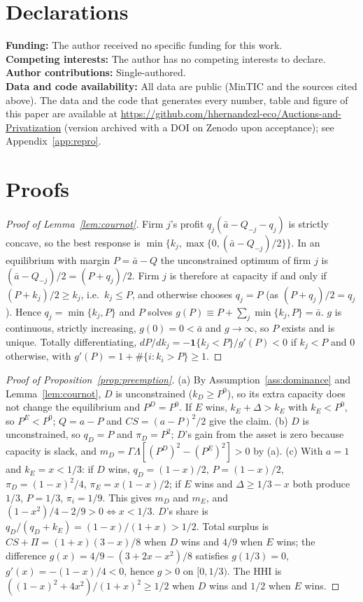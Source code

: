 \documentclass[12pt,a4paper]{article}
\newcommand{\repourl}{\url{https://github.com/hhernandezl-eco/Auctions-and-Privatization}}
\theoremstyle{definition}
\theoremstyle{remark}
\begin{document}
\section*{Declarations}
\noindent\textbf{Funding:} The author received no specific funding for this work.\\
\textbf{Competing interests:} The author has no competing interests to declare.\\
\textbf{Author contributions:} Single-authored.\\
\textbf{Data and code availability:} All data are public (MinTIC and the sources cited above). The data and the code that generates every number, table and figure of this paper are available at \repourl{} (version archived with a DOI on Zenodo upon acceptance); see Appendix~\ref{app:repro}.

\appendix
\section{Proofs}\label{app:proofs}

\begin{proof}[Proof of Lemma~\ref{lem:cournot}]
Firm $j$'s profit $q_j(\bar a-Q_{-j}-q_j)$ is strictly concave, so the best response is $\min\{k_j,\max\{0,(\bar a-Q_{-j})/2\}\}$. In an equilibrium with margin $P=\bar a-Q$ the unconstrained optimum of firm $j$ is $(\bar a-Q_{-j})/2=(P+q_j)/2$. Firm $j$ is therefore at capacity if and only if $(P+k_j)/2\ge k_j$, i.e.\ $k_j\le P$, and otherwise chooses $q_j=P$ (as $(P+q_j)/2=q_j$). Hence $q_j=\min\{k_j,P\}$ and $P$ solves $g(P)\equiv P+\sum_j\min\{k_j,P\}=\bar a$. $g$ is continuous, strictly increasing, $g(0)=0<\bar a$ and $g\to\infty$, so $P$ exists and is unique. Totally differentiating, $dP/dk_j=-\mathbf 1\{k_j<P\}/g'(P)<0$ if $k_j<P$ and $0$ otherwise, with $g'(P)=1+\#\{i:k_i>P\}\ge1$.
\end{proof}

\begin{proof}[Proof of Proposition~\ref{prop:preemption}]
(a) By Assumption~\ref{ass:dominance} and Lemma~\ref{lem:cournot}, $D$ is unconstrained ($k_D\ge P^0$), so its extra capacity does not change the equilibrium and $P^D=P^0$. If $E$ wins, $k_E+\Delta>k_E$ with $k_E<P^0$, so $P^E<P^0$; $Q=a-P$ and $CS=(a-P)^2/2$ give the claim. (b) $D$ is unconstrained, so $q_D=P$ and $\pi_D=P^2$; $D$'s gain from the asset is zero because capacity is slack, and $m_D=\Gamma\Lambda[(P^D)^2-(P^E)^2]>0$ by (a). (c) With $a=1$ and $k_E=x<1/3$: if $D$ wins, $q_D=(1-x)/2$, $P=(1-x)/2$, $\pi_D=(1-x)^2/4$, $\pi_E=x(1-x)/2$; if $E$ wins and $\Delta\ge1/3-x$ both produce $1/3$, $P=1/3$, $\pi_i=1/9$. This gives $m_D$ and $m_E$, and $(1-x^2)/4-2/9>0\iff x<1/3$. $D$'s share is $q_D/(q_D+k_E)=(1-x)/(1+x)>1/2$. Total surplus is $CS+\Pi=(1+x)(3-x)/8$ when $D$ wins and $4/9$ when $E$ wins; the difference $g(x)=4/9-(3+2x-x^2)/8$ satisfies $g(1/3)=0$, $g'(x)=-(1-x)/4<0$, hence $g>0$ on $[0,1/3)$. The HHI is $((1-x)^2+4x^2)/(1+x)^2\ge1/2$ when $D$ wins and $1/2$ when $E$ wins.
\end{proof}
\end{document}
